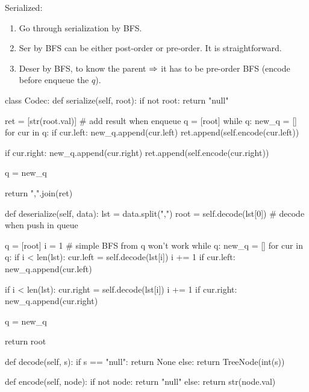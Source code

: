 \begin{center}
\end{center}
Serialized:
\begin{python}
\end{python}
\begin{enumerate}
\item Go through serialization by BFS. 
\item Ser by BFS can be either post-order or pre-order. It is straightforward.
\item Deser by BFS, to know the parent $\Rightarrow$ it has to be pre-order BFS (encode before enqueue the $q$).
\end{enumerate}
\begin{python}
class Codec:
  def serialize(self, root):
    if not root:
      return "null"

    ret = [str(root.val)] # add result when enqueue
    q = [root]
    while q:
      new_q = []
      for cur in q:
        if cur.left:
          new_q.append(cur.left)
        ret.append(self.encode(cur.left))
        
        if cur.right:
          new_q.append(cur.right)
        ret.append(self.encode(cur.right))

      q = new_q

    return ",".join(ret)

  def deserialize(self, data):
    lst = data.split(",")
    root = self.decode(lst[0])  # decode when push in queue

    q = [root]
    i = 1  # simple BFS from q won't work
    while q:
      new_q = []
      for cur in q:
        if i < len(lst):
          cur.left = self.decode(lst[i])
          i += 1
          if cur.left:
            new_q.append(cur.left)

        if i < len(lst):
          cur.right = self.decode(lst[i])
          i += 1
          if cur.right:
            new_q.append(cur.right)
      
      q = new_q

    return root

  def decode(self, s):
    if s == "null":
      return None
    else:
      return TreeNode(int(s))

  def encode(self, node):
    if not node:
      return "null"
    else:
      return str(node.val)
\end{python}
